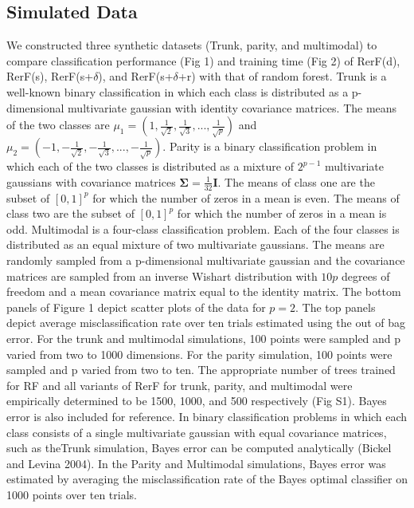 \documentclass{article} %
\begin{document}
\subsection{Simulated Data}
We constructed three synthetic datasets (Trunk, parity, and multimodal) to compare classification performance (Fig 1) and training time (Fig 2) of RerF(d), RerF(s), RerF(s+$\delta$), and RerF(s+$\delta$+r) with that of random forest. Trunk is a well-known binary classification \cite{} in which each class is distributed as a p-dimensional multivariate gaussian with identity covariance matrices. The means of the two classes are $\mu_1 = (1,\frac{1}{\sqrt{2}},\frac{1}{\sqrt{3}},...,\frac{1}{\sqrt{p}})$ and $\mu_2 = (-1,-\frac{1}{\sqrt{2}},-\frac{1}{\sqrt{3}},...,-\frac{1}{\sqrt{p}})$. Parity is a binary classification problem in which each of the two classes is distributed as a mixture of $2^{p-1}$ multivariate gaussians with covariance matrices $\boldsymbol{\Sigma} = \frac{1}{32}\boldsymbol{I}$. The means of class one are the subset of $[0,1]^p$ for which the number of zeros in a mean is even. The means of class two are the subset of $[0,1]^p$ for which the number of zeros in a mean is odd. Multimodal is a four-class classification problem. Each of the four classes is distributed as an equal mixture of two multivariate gaussians. The means are randomly sampled from a p-dimensional multivariate gaussian and the covariance matrices are sampled from an inverse Wishart distribution with $10p$ degrees of freedom and  a mean covariance matrix equal to the identity matrix. The bottom panels of Figure 1 depict scatter plots of the data for $p=2$. The top panels depict average misclassification rate over ten trials estimated using the out of bag error. For the trunk and multimodal simulations, 100 points were sampled and p varied from two to 1000 dimensions. For the parity simulation, 100 points were sampled and p varied from two to ten. The appropriate number of trees trained for RF and all variants of RerF for trunk, parity, and multimodal were empirically determined to be 1500, 1000, and 500 respectively (Fig S1). Bayes error is also included for reference. In binary classification problems in which each class consists of a single multivariate gaussian with equal covariance matrices, such as theTrunk simulation, Bayes error can be computed analytically (Bickel and Levina 2004). In the Parity and Multimodal simulations, Bayes error was estimated by averaging the misclassification rate of the Bayes optimal classifier on 1000 points over ten trials.
\end{document}
